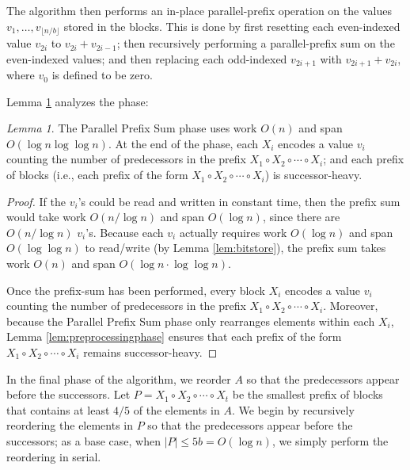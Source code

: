 \documentclass[twocolumn,10pt]{article}
\renewcommand{\paragraph}[1]{\vspace{0.09in}\noindent{\bf \boldmath #1.}}
\theoremstyle{remark}
\newtheorem{lemma}[thm]{Lemma}
\theoremstyle{remark}
\begin{document}
The algorithm then performs an in-place parallel-prefix operation on
the values $v_1, \ldots, v_{\lfloor n / b \rfloor}$ stored in the
blocks. This is done by first resetting each even-indexed value
$v_{2i}$ to $v_{2i} + v_{2i - 1}$; then recursively performing a
parallel-prefix sum on the even-indexed values; and then replacing
each odd-indexed $v_{2i + 1}$ with $v_{2i + 1} + v_{2i}$, where $v_0$
is defined to be zero.

Lemma \ref{lem:parallelprefix} analyzes the phase:
\begin{lemma}
  The Parallel Prefix Sum phase uses work $O(n)$ and span
  $O(\log n \log \log n)$. At the end of the phase, each $X_i$ encodes
  a value $v_i$ counting the number of predecessors in the prefix
  $X_1 \circ X_2 \circ \cdots \circ X_i$; and each prefix of blocks
  (i.e., each prefix of the form
  $X_1 \circ X_2 \circ \cdots \circ X_i$) is successor-heavy.
\label{lem:parallelprefix}
\end{lemma}
\begin{proof}
If the $v_i$'s could be read and written in constant time, then the
prefix sum would take work $O(n / \log n)$ and span $O(\log n)$, since
there are $O(n / \log n)$ $v_i$'s. Because each $v_i$ actually
requires work $O(\log n)$ and span $O(\log \log n)$ to read/write (by
Lemma \ref{lem:bitstore}), the prefix sum takes work $O(n)$ and span
$O(\log n \cdot \log \log n)$.

Once the prefix-sum has been performed, every block $X_i$
encodes a value $v_i$ counting the number of predecessors in the
prefix $X_1 \circ X_2 \circ \cdots \circ X_i$. Moreover, because the
Parallel Prefix Sum phase only rearranges elements within each $X_i$,
Lemma \ref{lem:preprocessingphase} ensures that each prefix of the
form $X_1 \circ X_2 \circ \cdots \circ X_i$ remains successor-heavy.
\end{proof}

\paragraph{In-Place Reordering}
In the final phase of the algorithm, we reorder $A$ so that the
predecessors appear before the successors. Let $P = X_1 \circ X_2
\circ \cdots \circ X_t$ be the smallest prefix of blocks that contains
at least $4/5$ of the elements in $A$. We begin by recursively
reordering the elements in $P$ so that the predecessors appear before
the successors; as a base case, when $|P| \le 5b = O(\log n)$, we
simply perform the reordering in serial.
\end{document}
